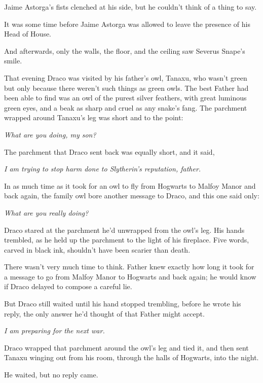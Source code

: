 Jaime Astorga’s fists clenched at his side, but he couldn’t think of a thing to say.

It was some time before Jaime Astorga was allowed to leave the presence of his Head of House.

And afterwards, only the walls, the floor, and the ceiling saw Severus Snape’s smile.

\later

That evening Draco was visited by his father’s owl, Tanaxu, who wasn’t green but only because there weren’t such things as green owls. The best Father had been able to find was an owl of the purest silver feathers, with great luminous green eyes, and a beak as sharp and cruel as any snake’s fang. The parchment wrapped around Tanaxu’s leg was short and to the point:

\emph{What are you doing, my son?}

The parchment that Draco sent back was equally short, and it said,

\emph{I am trying to stop harm done to Slytherin’s reputation, father.}

In as much time as it took for an owl to fly from Hogwarts to Malfoy Manor and back again, the family owl bore another message to Draco, and this one said only:

\emph{What are you really doing?}

Draco stared at the parchment he’d unwrapped from the owl’s leg. His hands trembled, as he held up the parchment to the light of his fireplace. Five words, carved in black ink, shouldn’t have been scarier than death.

There wasn’t very much time to think. Father knew exactly how long it took for a message to go from Malfoy Manor to Hogwarts and back again; he would know if Draco delayed to compose a careful lie.

But Draco still waited until his hand stopped trembling, before he wrote his reply, the only answer he’d thought of that Father might accept.

\emph{I am preparing for the next war.}

Draco wrapped that parchment around the owl’s leg and tied it, and then sent Tanaxu winging out from his room, through the halls of Hogwarts, into the night.

He waited, but no reply came.

